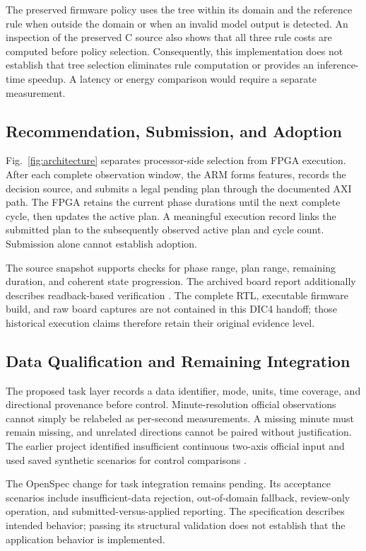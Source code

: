 \documentclass[conference]{IEEEtran}
\begin{document}
The preserved firmware policy uses the tree within its domain and the reference rule when outside the domain or when an invalid model output is detected. An inspection of the preserved C source also shows that all three rule costs are computed before policy selection. Consequently, this implementation does not establish that tree selection eliminates rule computation or provides an inference-time speedup. A latency or energy comparison would require a separate measurement.

\subsection{Recommendation, Submission, and Adoption}
Fig.~\ref{fig:architecture} separates processor-side selection from FPGA execution. After each complete observation window, the ARM forms features, records the decision source, and submits a legal pending plan through the documented AXI path. The FPGA retains the current phase durations until the next complete cycle, then updates the active plan. A meaningful execution record links the submitted plan to the subsequently observed active plan and cycle count. Submission alone cannot establish adoption.

The source snapshot supports checks for phase range, plan range, remaining duration, and coherent state progression. The archived board report additionally describes readback-based verification \cite{projectreport}. The complete RTL, executable firmware build, and raw board captures are not contained in this DIC4 handoff; those historical execution claims therefore retain their original evidence level.

\subsection{Data Qualification and Remaining Integration}
The proposed task layer records a data identifier, mode, units, time coverage, and directional provenance before control. Minute-resolution official observations cannot simply be relabeled as per-second measurements. A missing minute must remain missing, and unrelated directions cannot be paired without justification. The earlier project identified insufficient continuous two-axis official input and used saved synthetic scenarios for control comparisons \cite{projectdesign}.

The OpenSpec change for task integration remains pending. Its acceptance scenarios include insufficient-data rejection, out-of-domain fallback, review-only operation, and submitted-versus-applied reporting. The specification describes intended behavior; passing its structural validation does not establish that the application behavior is implemented.
\end{document}
